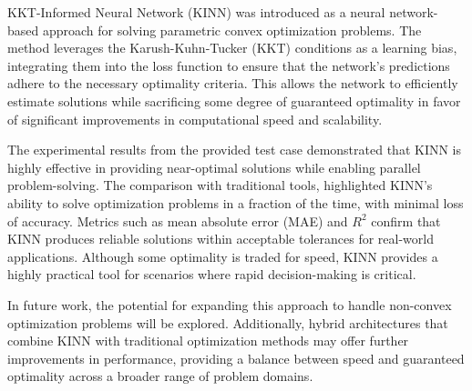 \documentclass[
]{article}
\begin{document}
KKT-Informed Neural Network (KINN) was introduced as a neural
network-based approach for solving parametric convex optimization
problems. The method leverages the Karush-Kuhn-Tucker (KKT) conditions
as a learning bias, integrating them into the loss function to ensure
that the network's predictions adhere to the necessary optimality
criteria. This allows the network to efficiently estimate solutions
while sacrificing some degree of guaranteed optimality in favor of
significant improvements in computational speed and scalability.

The experimental results from the provided test case demonstrated that
KINN is highly effective in providing near-optimal solutions while
enabling parallel problem-solving. The comparison with traditional
tools, highlighted KINN's ability to solve optimization problems in a
fraction of the time, with minimal loss of accuracy. Metrics such as
mean absolute error (MAE) and \(R^2\) confirm that KINN produces
reliable solutions within acceptable tolerances for real-world
applications. Although some optimality is traded for speed, KINN
provides a highly practical tool for scenarios where rapid
decision-making is critical.

In future work, the potential for expanding this approach to handle
non-convex optimization problems will be explored. Additionally, hybrid
architectures that combine KINN with traditional optimization methods
may offer further improvements in performance, providing a balance
between speed and guaranteed optimality across a broader range of
problem domains.


  
\end{document}
